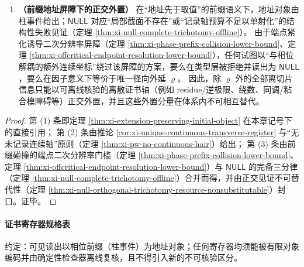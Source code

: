 \begin{theorem}
\begin{enumerate}
  \item \textbf{（前缀地址屏障下的正交外置）}
  在“地址先于取值”的前缀语义下，地址对象由柱事件给出；\(\mathsf{NULL}\) 对应“局部截面不存在”或“记录轴预算不足以单射化”的结构性失败见证（定理 \ref{thm:xi-null-complete-trichotomy-offline}）。
  由于端点紧化诱导二次分辨率屏障（定理 \ref{thm:xi-phase-prefix-collision-lower-bound}、定理 \ref{thm:xi-offcritical-endpoint-resolution-lower-bound}），任何试图以“与相位解耦的额外连续坐标”绕过该屏障的方案，要么在类型层被拒绝并读出为 \(\mathsf{NULL}\)，要么在因子意义下等价于唯一径向外延 \(\varrho\)。
  因此，除 \(\varrho\) 外的全部离切片信息只能以可离线核验的离散证书轴（例如 residue/逆极限、绕数、同调/粘合模障碍等）正交外置，并且这些外置分量在体系内不可相互替代。
\end{enumerate}
\end{theorem}

\begin{proof}
第 (1) 条即定理 \ref{thm:xi-extension-preserving-initial-object} 在本章记号下的直接引用；
第 (2) 条由推论 \ref{cor:xi-unique-continuous-transverse-register} 与“无未记录连续轴”原则（定理 \ref{thm:xi-pw-no-continuous-hair}）给出；
第 (3) 条由前缀碰撞的端点二次分辨率门槛（定理 \ref{thm:xi-phase-prefix-collision-lower-bound}、定理 \ref{thm:xi-offcritical-endpoint-resolution-lower-bound}）与 \(\mathsf{NULL}\) 的完备三分律（定理 \ref{thm:xi-null-complete-trichotomy-offline}）合并而得，并由正交见证不可替代性（定理 \ref{thm:xi-null-orthogonal-trichotomy-resource-nonsubstitutable}）封口。证毕。
\end{proof}

\paragraph{证书寄存器规格表}
约定：可见读出以相位前缀（柱事件）为地址对象；任何寄存器均须能被有限对象编码并由确定性检查器离线复核，且不得引入新的不可核验区分。

